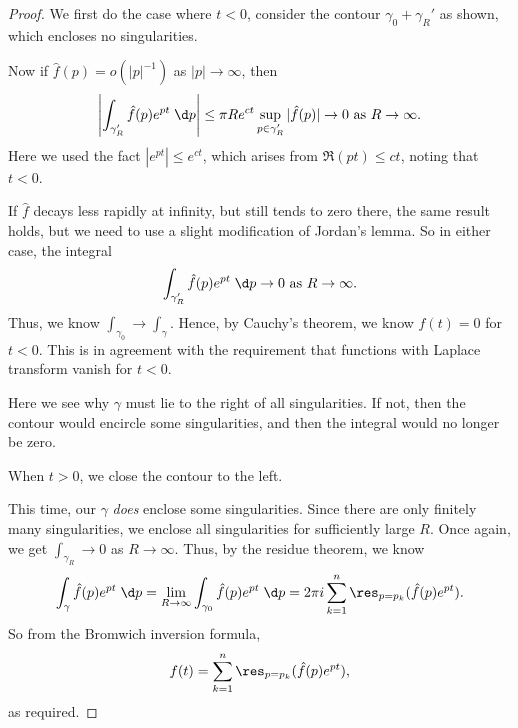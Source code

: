 \documentclass[a4paper]{article}
\begin{document}
\begin{proof}
  We first do the case where $t < 0$, consider the contour $\gamma_0 + \gamma_R'$ as shown, which encloses no singularities.
  \begin{center}
  \end{center}
  Now if $\hat{f}(p) = o(|p|^{-1})$ as $|p| \to \infty$, then
  \[
    \left|\int_{\gamma_R'} \hat{f}(p) e^{pt}\;\d p\right| \leq \pi R e^{ct} \sup_{p \in \gamma_R'} |\hat{f}(p)| \to 0 \text{ as }R \to \infty.
  \]
  Here we used the fact $|e^{pt}| \leq e^{ct}$, which arises from $\Re (pt) \leq ct$, noting that $t < 0$.

  If $\hat{f}$ decays less rapidly at infinity, but still tends to zero there, the same result holds, but we need to use a slight modification of Jordan's lemma. So in either case, the integral
  \[
    \int_{\gamma_R'} \hat{f}(p) e^{pt}\;\d p \to 0\text{ as }R\to \infty.
  \]
  Thus, we know $\int_{\gamma_0} \to \int_\gamma$. Hence, by Cauchy's theorem, we know $f(t) = 0$ for $t < 0$. This is in agreement with the requirement that functions with Laplace transform vanish for $t < 0$.

  Here we see why $\gamma$ must lie to the right of all singularities. If not, then the contour would encircle some singularities, and then the integral would no longer be zero.

  When $t > 0$, we close the contour to the left.
  \begin{center}
  \end{center}
  This time, our $\gamma$ \emph{does} enclose some singularities. Since there are only finitely many singularities, we enclose all singularities for sufficiently large $R$. Once again, we get $\int_{\gamma_R} \to 0$ as $R \to \infty$. Thus, by the residue theorem, we know
  \[
    \int_{\gamma} \hat{f}(p) e^{pt} \;\d p = \lim_{R \to \infty} \int_{\gamma_0}\hat{f}(p) e^{pt}\;\d p = 2\pi i \sum_{k = 1}^n \res_{p = p_k} (\hat{f}(p) e^{pt}).
  \]
  So from the Bromwich inversion formula,
  \[
    f(t) = \sum_{k = 1}^n \res_{p = p_k} (\hat{f}(p) e^{pt}),
  \]
  as required.
\end{proof}
\end{document}
